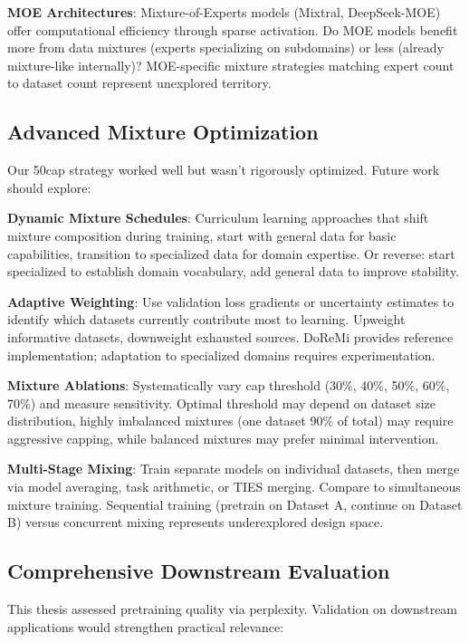 \textbf{MOE Architectures}: Mixture-of-Experts models (Mixtral, DeepSeek-MOE) offer computational efficiency through sparse activation. Do MOE models benefit more from data mixtures (experts specializing on subdomains) or less (already mixture-like internally)? MOE-specific mixture strategies matching expert count to dataset count represent unexplored territory.

\subsection{Advanced Mixture Optimization}

Our 50cap strategy worked well but wasn't rigorously optimized. Future work should explore:

\textbf{Dynamic Mixture Schedules}: Curriculum learning approaches that shift mixture composition during training, start with general data for basic capabilities, transition to specialized data for domain expertise. Or reverse: start specialized to establish domain vocabulary, add general data to improve stability.

\textbf{Adaptive Weighting}: Use validation loss gradients or uncertainty estimates to identify which datasets currently contribute most to learning. Upweight informative datasets, downweight exhausted sources. DoReMi \parencite{xie2023doremi} provides reference implementation; adaptation to specialized domains requires experimentation.

\textbf{Mixture Ablations}: Systematically vary cap threshold (30\%, 40\%, 50\%, 60\%, 70\%) and measure sensitivity. Optimal threshold may depend on dataset size distribution, highly imbalanced mixtures (one dataset 90\% of total) may require aggressive capping, while balanced mixtures may prefer minimal intervention.

\textbf{Multi-Stage Mixing}: Train separate models on individual datasets, then merge via model averaging, task arithmetic, or TIES merging. Compare to simultaneous mixture training. Sequential training (pretrain on Dataset A, continue on Dataset B) versus concurrent mixing represents underexplored design space.

\subsection{Comprehensive Downstream Evaluation}

This thesis assessed pretraining quality via perplexity. Validation on downstream applications would strengthen practical relevance:

